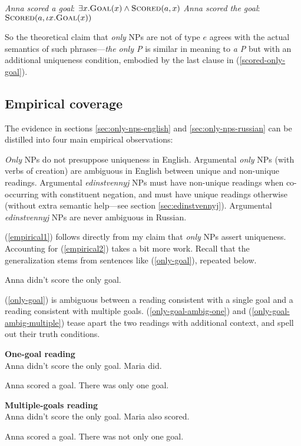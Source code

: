 \begin{exe}
	\ex \label{a-goal} \textit{Anna scored a goal}: $\exists x . \textsc{Goal}(x) \land \textsc{Scored}(a, x)$
	\ex \label{the-goal} \textit{Anna scored the goal}: $\textsc{Scored}(a, \iota x . \textsc{Goal}(x))$
\end{exe}

So the theoretical claim that \textit{only} NPs are not of type $e$ agrees with the actual semantics of such phrases---\textit{the only P} is similar in meaning to \textit{a P} but with an additional uniqueness condition, embodied by the last clause in (\ref{scored-only-goal}).

\subsection{Empirical coverage}
The evidence in sections \ref{sec:only-nps-english} and \ref{sec:only-nps-russian} can be distilled into four main empirical observations:

\begin{exe}
	\ex \label{empirical1} \textit{Only} NPs do not presuppose uniqueness in English.
	\ex \label{empirical2} Argumental \textit{only} NPs (with verbs of creation) are ambiguous in English between unique and non-unique readings.
	\ex \label{empirical3} Argumental \textit{edinstvennyj} NPs must have non-unique readings when co-occurring with constituent negation, and must have unique readings otherwise (without extra semantic help---see section \ref{sec:edinstvennyj}).
	\ex \label{empirical4} Argumental \textit{edinstvennyj} NPs are never ambiguous in Russian.
\end{exe}

(\ref{empirical1}) follows directly from my claim that \textit{only} NPs assert uniqueness. Accounting for (\ref{empirical2}) takes a bit more work. Recall that the generalization stems from sentences like (\ref{only-goal}), repeated below.

\begin{exe}
	 Anna didn't score the only goal.
\end{exe}

(\ref{only-goal}) is ambiguous between a reading consistent with a single goal and a reading consistent with multiple goals. (\ref{only-goal-ambig-one}) and (\ref{only-goal-ambig-multiple}) tease apart the two readings with additional context, and spell out their truth conditions.

\begin{exe}
	\ex \label{only-goal-ambig-one} \textbf{One-goal reading} \\ Anna didn't score the only goal. Maria did.
	\begin{xlist}
		\ex Anna scored a goal.
		\ex There was only one goal.
	\end{xlist}

	\ex \label{only-goal-ambig-multiple} \textbf{Multiple-goals reading} \\ Anna didn't score the only goal. Maria also scored.
	\begin{xlist}
		\ex Anna scored a goal.
		\ex There was not only one goal.
	\end{xlist}
\end{exe}

